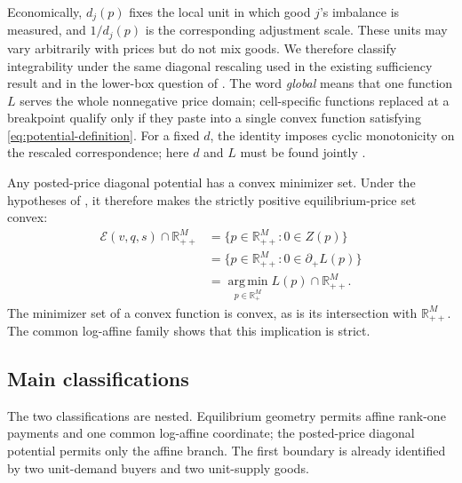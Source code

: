 \documentclass[11pt,a4paper,fleqn]{article}
\theoremstyle{plain}
\theoremstyle{definition}
\newcommand{\R}{\mathbb{R}}
\newcommand{\argmin}{\operatorname*{arg\,min}}
\newcommand{\Ecal}{\mathcal{E}}
\begin{document}
Economically, $d_j(p)$ fixes the local unit in which good $j$'s imbalance is measured, and $1/d_j(p)$ is the corresponding adjustment scale. These units may vary arbitrarily with prices but do not mix goods. We therefore classify integrability under the same diagonal rescaling used in the existing sufficiency result and in the lower-box question of . The word \emph{global} means that one function $L$ serves the whole nonnegative price domain; cell-specific functions replaced at a breakpoint qualify only if they paste into a single convex function satisfying \eqref{eq:potential-definition}. For a fixed $d$, the identity imposes cyclic monotonicity on the rescaled correspondence; here $d$ and $L$ must be found jointly \citep{rockafellar1966}.

Any posted-price diagonal potential has a convex minimizer set. Under the hypotheses of , it therefore makes the strictly positive equilibrium-price set convex:
\begin{equation}\label{eq:argmin-equilibrium}
\begin{aligned}
\Ecal(v,q,s)\cap\R_{++}^M
&=\{p\in\R_{++}^M:0\in Z(p)\}\\
&=\{p\in\R_{++}^M:0\in\partial_+L(p)\}\\
&=\argmin_{p\in\R_+^M}L(p)\cap\R_{++}^M.
\end{aligned}
\end{equation}
The minimizer set of a convex function is convex, as is its intersection with $\R_{++}^M$. The common log-affine family shows that this implication is strict.

\subsection{Main classifications}\label{subsec:main-results}

The two classifications are nested. Equilibrium geometry permits affine rank-one payments and one common log-affine coordinate; the posted-price diagonal potential permits only the affine branch. The first boundary is already identified by two unit-demand buyers and two unit-supply goods.
\end{document}
